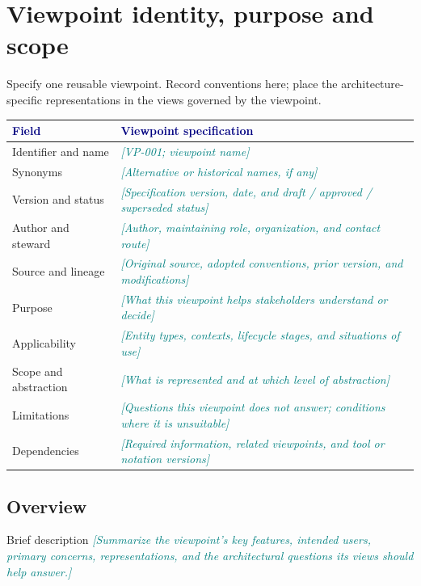 \documentclass[11pt,letterpaper]{article}
\newcommand{\TemplatePageBreak}{\clearpage}
\newcommand{\FillIn}[1]{\textcolor{Teal}{\sffamily\itshape[#1]}}
\newcommand{\TableHead}[1]{\textcolor{Navy}{\sffamily\bfseries#1}}
\newcommand{\Lead}[1]{\textcolor{Muted}{#1}\par\vspace{3pt}}
\begin{document}

\section{Viewpoint identity, purpose and scope}
\Lead{Specify one reusable viewpoint. Record conventions here; place the
architecture-specific representations in the views governed by the viewpoint.}

{\small
\begin{tabularx}{\linewidth}{@{}L{1.49in}Y@{}}
\toprule
\TableHead{Field} & \TableHead{Viewpoint specification}\\
\midrule
Identifier and name & \FillIn{VP-001; viewpoint name}\\
Synonyms & \FillIn{Alternative or historical names, if any}\\
Version and status & \FillIn{Specification version, date, and draft / approved / superseded status}\\
Author and steward & \FillIn{Author, maintaining role, organization, and contact route}\\
Source and lineage & \FillIn{Original source, adopted conventions, prior version, and modifications}\\
Purpose & \FillIn{What this viewpoint helps stakeholders understand or decide}\\
Applicability & \FillIn{Entity types, contexts, lifecycle stages, and situations of use}\\
Scope and abstraction & \FillIn{What is represented and at which level of abstraction}\\
Limitations & \FillIn{Questions this viewpoint does not answer; conditions where it is unsuitable}\\
Dependencies & \FillIn{Required information, related viewpoints, and tool or notation versions}\\
\bottomrule
\end{tabularx}}

\subsection{Overview}
\begin{TemplateRecord}{Brief description}
\FillIn{Summarize the viewpoint's key features, intended users, primary concerns,
representations, and the architectural questions its views should help answer.}
\end{TemplateRecord}
\end{document}
